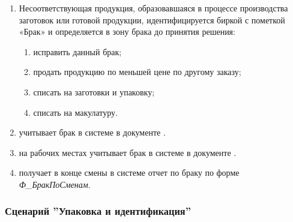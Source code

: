 \begin{enumerate}
\item	Несоответствующая продукция, образовавшаяся в процессе производства заготовок или готовой продукции, идентифицируется биркой с пометкой «Брак» и определяется в зону брака до принятия решения:

\begin{enumerate}
    \item исправить данный брак;
    \item продать продукцию по меньшей цене по другому заказу;
    \item списать на заготовки и упаковку;
    \item списать на макулатуру.
\end{enumerate}
\item	\gaoperator учитывает брак в системе \gofro в документе .
\item	\operator на  рабочих местах учитывает брак в системе \gofro в документе .
\item	\master  получает в конце смены в системе \gofro отчет по браку по форме \textit{Ф\_БракПоСменам}.



\end{enumerate}



\subsubsection{Сценарий ''Упаковка и идентификация''}
\label{bp:production_40}

